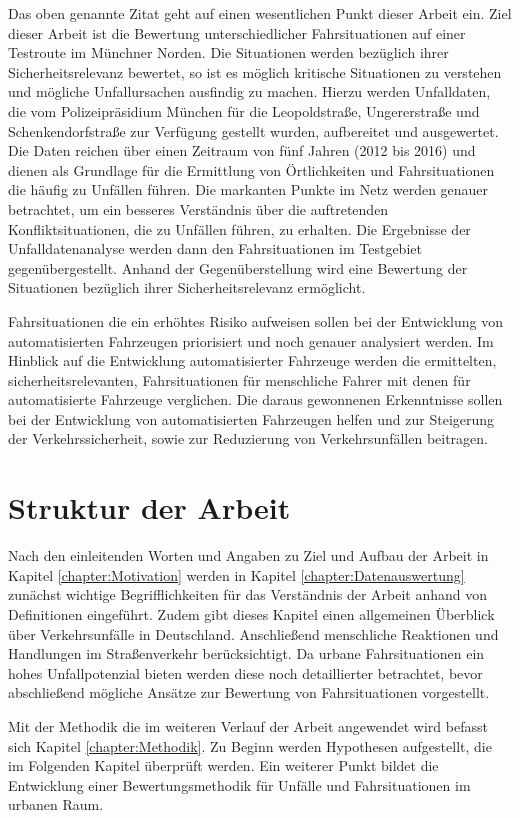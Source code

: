 Das oben genannte Zitat geht auf einen wesentlichen Punkt dieser Arbeit ein. Ziel dieser Arbeit ist die Bewertung unterschiedlicher Fahrsituationen auf einer Testroute im Münchner Norden. Die Situationen werden bezüglich ihrer Sicherheitsrelevanz bewertet, so ist es möglich kritische Situationen zu verstehen und mögliche Unfallursachen ausfindig zu machen. Hierzu werden Unfalldaten, die vom Polizeipräsidium München für die Leopoldstraße, Ungererstraße und Schenkendorfstraße zur Verfügung gestellt wurden, aufbereitet und ausgewertet. Die Daten reichen über einen Zeitraum von fünf Jahren (2012 bis 2016) und dienen als Grundlage für die Ermittlung von Örtlichkeiten und Fahrsituationen die häufig zu Unfällen führen. Die markanten Punkte im Netz werden genauer betrachtet, um ein besseres Verständnis über die auftretenden Konfliktsituationen, die zu Unfällen führen, zu erhalten. Die Ergebnisse der Unfalldatenanalyse werden dann den Fahrsituationen im Testgebiet gegenübergestellt. Anhand der Gegenüberstellung wird eine Bewertung der Situationen bezüglich ihrer Sicherheitsrelevanz ermöglicht.

Fahrsituationen die ein erhöhtes Risiko aufweisen sollen bei der Entwicklung von automatisierten Fahrzeugen priorisiert und noch genauer analysiert werden. Im Hinblick auf die Entwicklung automatisierter Fahrzeuge werden die ermittelten, sicherheitsrelevanten, Fahrsituationen für menschliche Fahrer mit denen für automatisierte Fahrzeuge verglichen. Die daraus gewonnenen Erkenntnisse sollen bei der Entwicklung von automatisierten Fahrzeugen helfen und zur Steigerung der Verkehrssicherheit, sowie zur Reduzierung von Verkehrsunfällen beitragen. 

\section{Struktur der Arbeit}
Nach den einleitenden Worten und Angaben zu Ziel und Aufbau der Arbeit in Kapitel \ref{chapter:Motivation} werden in Kapitel \ref{chapter:Datenauswertung} zunächst wichtige Begrifflichkeiten für das Verständnis der Arbeit anhand von Definitionen eingeführt. Zudem gibt dieses Kapitel einen allgemeinen Überblick über Verkehrsunfälle in Deutschland. Anschließend menschliche Reaktionen und Handlungen im Straßenverkehr berücksichtigt. Da urbane Fahrsituationen ein hohes Unfallpotenzial bieten werden diese noch detaillierter betrachtet, bevor abschließend mögliche Ansätze zur Bewertung von Fahrsituationen vorgestellt.

Mit der Methodik die im weiteren Verlauf der Arbeit angewendet wird befasst sich Kapitel \ref{chapter:Methodik}. Zu Beginn werden Hypothesen aufgestellt, die im Folgenden Kapitel überprüft werden. Ein weiterer Punkt bildet die Entwicklung einer Bewertungsmethodik für Unfälle und Fahrsituationen im urbanen Raum.

